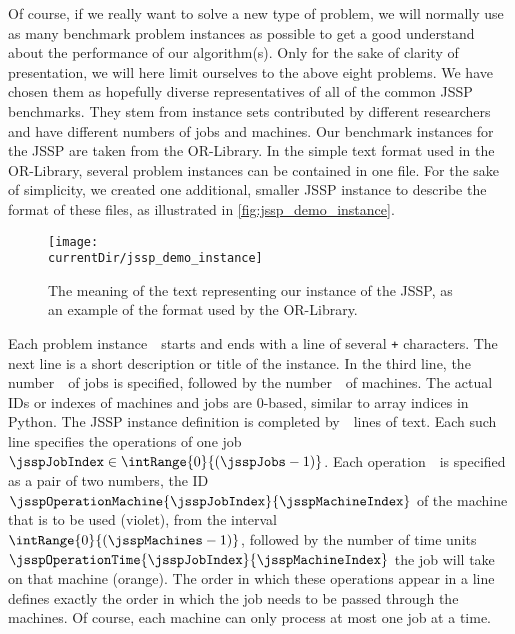 Of course, if we really want to solve a new type of problem, we will normally use as many benchmark problem instances as possible to get a good understand about the performance of our algorithm(s).
Only for the sake of clarity of presentation, we will here limit ourselves to the above eight problems.
We have chosen them as hopefully diverse representatives of all of the common \gls{JSSP} benchmarks.
They stem from instance sets contributed by different researchers and have different numbers of jobs and machines.%
%
\endhsection%
%
%
\label{sec:jsspDemoInstance}%
Our benchmark instances for the \gls{JSSP} are taken from the OR\nobreakdash-Library.
In the simple text format used in the OR\nobreakdash-Library, several problem instances can be contained in one file.
For the sake of simplicity, we created one additional, smaller \gls{JSSP} instance to describe the format of these files, as illustrated in \autoref{fig:jssp_demo_instance}.

\begin{figure}%
\centering%
\texttt{[image: \\currentDir/jssp\_demo\_instance]}%
\caption{The meaning of the text representing our  instance of the \gls{JSSP}, as an example of the format used by the OR-Library.}%
\label{fig:jssp_demo_instance}%
\end{figure}

Each problem instance~\instance\ starts and ends with a line of several \texttt{+} characters.
The next line is a short description or title of the instance.
In the third line, the number~\jsspJobs\ of jobs is specified, followed by the number~\jsspMachines\ of machines.
The actual IDs or indexes of machines and jobs are 0\nobreakdash-based, similar to array indices in Python.
The \gls{JSSP} instance definition is completed by~\jsspJobs\ lines of text.
Each such line specifies the operations of one job~$\jsspJobIndex\in\intRange{0}{(\jsspJobs-1)}$.
Each operation~\jsspMachineIndex\ is specified as a pair of two numbers, the ID~$\jsspOperationMachine{\jsspJobIndex}{\jsspMachineIndex}$ of the machine that is to be used ({\color{jssp-machine}violet}), from the interval~$\intRange{0}{(\jsspMachines-1)}$, followed by the number of time units~$\jsspOperationTime{\jsspJobIndex}{\jsspMachineIndex}$ the job will take on that machine ({\color{jssp-time}orange}).
The order in which these operations appear in a line defines exactly the order in which the job needs to be passed through the machines.
Of course, each machine can only process at most one job at a time.

